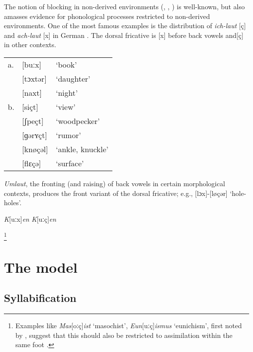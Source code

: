 
The notion of blocking in non-derived environments (\citealp[163]{Kiparsky1973a}, \citeyear[152]{Kiparsky1982a}, \citealp{Mascaro1976}) is well-known, but \citet{Hall2006} also amasses evidence for phonological processes restricted to non-derived environments. One of the most famous examples is the distribution of \emph{ich-laut} [ç] and \emph{ach-laut} [x] in German \citep{Bloomfield1930}. The dorsal fricative is [x] before back vowels and[ç] in other contexts.

\begin{example}
\begin{tabular}{l l l}
a. & [buːx]   & `book'           \\
   & [tɔxtər] & `daughter'       \\
   & [naxt]   & `night'          \\
b. & [siçt]   & `view'           \\
   & [ʃpeçt]  & `woodpecker'     \\
   & [ɡərʏçt] & `rumor'          \\
   & [knøçəl] & `ankle, knuckle' \\
   & [flɛçə]  & `surface'        \\
\end{tabular}
\end{example}

\emph{Umlaut}, the fronting (and raising) of back vowels in certain morphological contexts, produces the front variant of the dorsal fricative; e.g., [lɔx]-[løçər] `hole-holes'.

\emph{K}[uːx]\emph{en}
\emph{K}[uːç]\emph{en}

\footnote{Examples like \emph{Mas}[oːç]\emph{ist} `masochist', \emph{Eun}[uːç]\emph{ismus} `eunichism', first noted by \citet{Merchant1994}, suggest that this should also be restricted to assimilation within the same foot \citep[226f.]{Jensen2000}.}

\section{The model}

\subsection{Syllabification}

